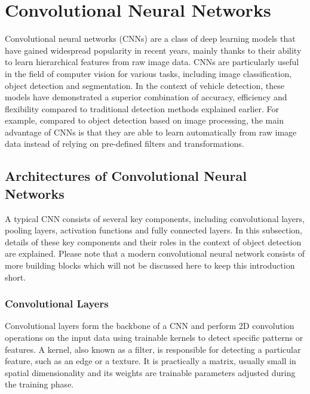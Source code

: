 
\section{Convolutional Neural Networks}
\label{CNNs}


Convolutional neural networks (CNNs) are a class of deep learning models that
have gained widespread popularity in recent years, mainly thanks to their
ability to learn hierarchical features from raw image data. CNNs are
particularly useful in the field of computer vision for various tasks, including
image classification, object detection and segmentation. In the context of
vehicle detection, these models have demonstrated a superior combination of
accuracy, efficiency and flexibility compared to traditional detection methods
explained earlier. For example, compared to object detection based on image
processing, the main advantage of CNNs is that they are able to learn
automatically from raw image data instead of relying on pre-defined filters and
transformations. \cite{Li2022}


\subsection{Architectures of Convolutional Neural Networks}

A typical CNN consists of several key components, including convolutional
layers, pooling layers, activation functions and fully connected layers. In this
subsection, details of these key components and their roles in the context of
object detection are explained. Please note that a modern convolutional neural
network consists of more building blocks which will not be discussed here to
keep this introduction short.

\subsubsection{Convolutional Layers}

Convolutional layers form the backbone of a CNN and perform 2D convolution
operations on the input data using trainable kernels to detect specific patterns
or features. A kernel, also known as a filter, is responsible for detecting a
particular feature, such as an edge or a texture. It is practically a matrix,
usually small in spatial dimensionality and its weights are trainable parameters
adjusted during the training phase. \cite{OShea2015}

